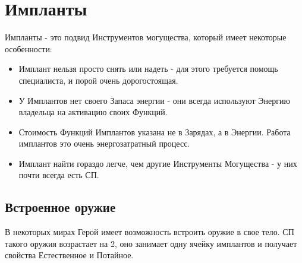 \section{Импланты}
Импланты - это подвид Инструментов могущества, который имеет некоторые особенности:
\begin{itemize}
\item Имплант нельзя просто снять или надеть - для этого требуется помощь специалиста, и порой очень дорогостоящая.
\item У Имплантов нет своего Запаса энергии - они всегда используют Энергию владельца на активацию своих Функций.
\item Стоимость Функций Имплантов указана не в Зарядах, а в Энергии. Работа имплантов это очень энергозатратный процесс.
\item Имплант найти гораздо легче, чем другие Инструменты Могущества - у них почти всегда есть СП.
\end{itemize}
\subsection{Встроенное оружие}
В некоторых мирах Герой имеет возможность встроить оружие в свое тело. СП такого оружия возрастает на 2, оно занимает одну ячейку имплантов и получает свойства Естественное и Потайное.

